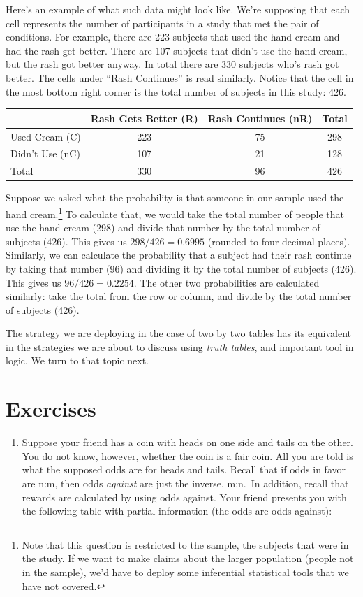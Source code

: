 \documentclass[]{tufte-book}
\providecommand{\tightlist}{%
  \setlength{\itemsep}{0pt}\setlength{\parskip}{0pt}}
\begin{document}
Here's an example of what such data might look like. We're supposing that each cell represents the number of participants in a study that met the pair of conditions. For example, there are 223 subjects that used the hand cream and had the rash get better. There are 107 subjects that didn't use the hand cream, but the rash got better anyway. In total there are 330 subjects who's rash got better. The cells under ``Rash Continues'' is read similarly. Notice that the cell in the most bottom right corner is the total number of subjects in this study: 426.

\begin{longtable}[]{@{}lccc@{}}
\toprule
& Rash Gets Better (R) & Rash Continues (nR) & Total\tabularnewline
\midrule
\endhead
Used Cream (C) & 223 & 75 & 298\tabularnewline
Didn't Use (nC) & 107 & 21 & 128\tabularnewline
Total & 330 & 96 & 426\tabularnewline
\bottomrule
\end{longtable}

Suppose we asked what the probability is that someone in our sample used the hand cream.\footnote{Note that this question is restricted to the sample, the subjects that were in the study. If we want to make claims about the larger population (people not in the sample), we'd have to deploy some inferential statistical tools that we have not covered.} To calculate that, we would take the total number of people that use the hand cream (298) and divide that number by the total number of subjects (426). This gives us \(298/426=0.6995\) (rounded to four decimal places). Similarly, we can calculate the probability that a subject had their rash continue by taking that number (96) and dividing it by the total number of subjects (426). This gives us \(96/426=0.2254\). The other two probabilities are calculated similarly: take the total from the row or column, and divide by the total number of subjects (426).

The strategy we are deploying in the case of two by two tables has its equivalent in the strategies we are about to discuss using \emph{truth tables}, and important tool in logic. We turn to that topic next.

\hypertarget{exercises-7}{%
\section*{Exercises}\label{exercises-7}}

\begin{enumerate}
\def\labelenumi{\arabic{enumi}.}
\tightlist
\item
  Suppose your friend has a coin with heads on one side and tails on the other. You do not know, however, whether the coin is a fair coin. All you are told is what the supposed odds are for heads and tails. Recall that if odds in favor are n:m, then odds \emph{against} are just the inverse, m:n.~In addition, recall that rewards are calculated by using odds against. Your friend presents you with the following table with partial information (the odds are odds against):
\end{enumerate}
\end{document}
